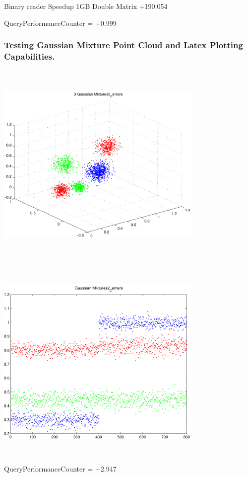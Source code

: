 \documentclass[9pt]{article}
\theoremstyle{plain}
\theoremstyle{definition}
\theoremstyle{remark}
\numberwithin{equation}{section}
\begin{document}
Binary reader Speedup 1GB Double Matrix +190.054

QueryPerformanceCounter  =  +0.999
\subsubsection{Testing Gaussian Mixture Point Cloud and Latex Plotting Capabilities.}
\includegraphics[width=10.0cm,height=10.0cm]{GaussianMixture_Dim_3_Centers2.pdf}

\includegraphics[width=10.0cm,height=10.0cm]{GaussianMixture_Dim_1_Centers2.pdf}

QueryPerformanceCounter  =  +2.947
\end{document}
